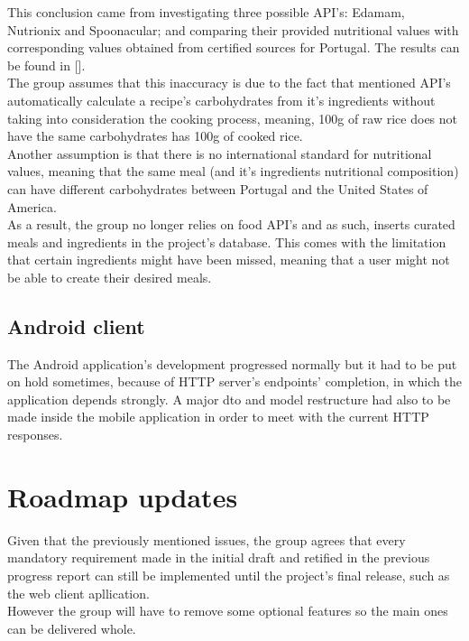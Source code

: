     This conclusion came from investigating three possible API's: Edamam, Nutrionix and Spoonacular; and comparing
    their provided nutritional values with corresponding values obtained from
    certified sources for Portugal. The results can be found in [].\\

    The group assumes that this inaccuracy is due to the fact that
    mentioned API's automatically calculate a recipe's carbohydrates
    from it's ingredients without taking into consideration the cooking process, meaning, 
    100g of raw rice does not have the same carbohydrates has 100g of cooked rice.\\

    Another assumption is that there is no international standard for nutritional values,
    meaning that the same meal (and it's ingredients nutritional composition) 
    can have different carbohydrates between Portugal and the United States of America.\\
    
    As a result, the group no longer relies on food API's and as such, inserts curated meals and ingredients 
    in the project's database. 
    This comes with the limitation that certain ingredients might have been missed,
    meaning that a user might not be able to create their desired meals.

    \subsection{Android client}

    The Android application's development progressed normally but it had to be put on hold sometimes, because of HTTP server's endpoints' completion, in which the application
    depends strongly. A major dto and model restructure had also to be made inside the mobile application in order to meet with the current HTTP responses.\\

    \section{Roadmap updates}

    Given that the previously mentioned issues, the group agrees that every mandatory requirement made in the initial draft
    and retified in the previous progress report can still be implemented until the project's final release, such as the web client apllication.\\
    
    However the group will have to remove some optional features so the main ones can be delivered whole.